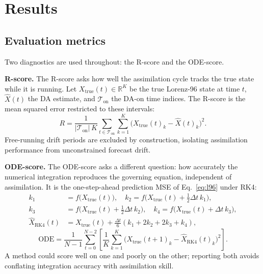\documentclass[final,5p,times,twocolumn,authoryear]{elsarticle}
\begin{document}

\section{Results}
\label{sec:results}

\subsection{Evaluation metrics}
\label{sec:metrics}

Two diagnostics are used throughout: the R-score and the ODE-score.

\textbf{R-score.} The R-score asks how well the assimilation cycle
tracks the true state while it is running. Let
$X_\text{true}(t) \in \mathbb{R}^K$ be the true Lorenz-96 state at
time $t$, $\hat{X}(t)$ the DA estimate, and $\mathcal{T}_\text{on}$
the DA-on time indices. The R-score is the mean squared error
restricted to these intervals:
\begin{equation}
R = \frac{1}{|\mathcal{T}_\text{on}| \, K}
\sum_{t \in \mathcal{T}_\text{on}} \sum_{k=1}^{K}
\bigl(X_\text{true}(t)_k - \hat{X}(t)_k\bigr)^2 .
\label{eq:rscore}
\end{equation}
Free-running drift periods are excluded by construction, isolating
assimilation performance from unconstrained forecast drift.

\textbf{ODE-score.} The ODE-score asks a different question: how
accurately the numerical integration reproduces the governing
equation, independent of assimilation. It is the one-step-ahead
prediction MSE of Eq.~\eqref{eq:l96} under RK4:
\begin{align}
k_1 &= f\bigl(X_\text{true}(t)\bigr), \quad
k_2 = f\bigl(X_\text{true}(t) + \tfrac{1}{2}\Delta t\, k_1\bigr), \\
k_3 &= f\bigl(X_\text{true}(t) + \tfrac{1}{2}\Delta t\, k_2\bigr), \quad
k_4 = f\bigl(X_\text{true}(t) + \Delta t\, k_3\bigr), \\
\hat{X}_\text{RK4}(t) &= X_\text{true}(t) +
\tfrac{\Delta t}{6}(k_1 + 2k_2 + 2k_3 + k_4),
\end{align}
\begin{equation}
\text{ODE} = \frac{1}{N-1}\sum_{t=0}^{N-2}
\left[\frac{1}{K}\sum_{k=1}^{K}
\bigl(X_\text{true}(t+1)_k - \hat{X}_\text{RK4}(t)_k\bigr)^2\right].
\label{eq:odescore}
\end{equation}
A method could score well on one and poorly on the other; reporting
both avoids conflating integration accuracy with assimilation skill.
\end{document}
